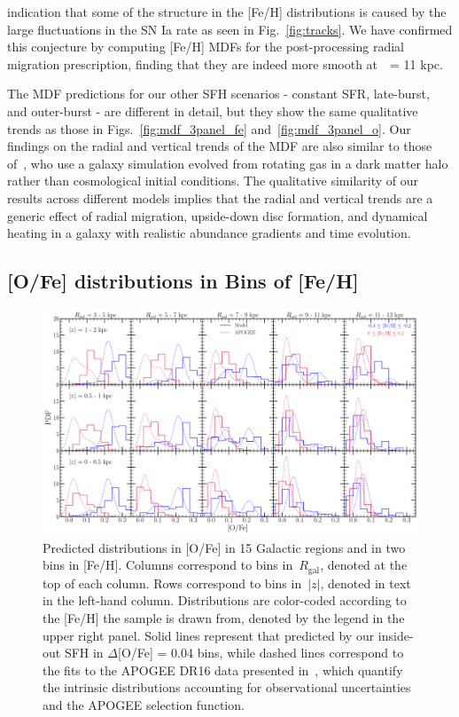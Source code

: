 \documentclass[draft2.tex]{subfiles}
\begin{document}
indication that some of the structure in the [Fe/H] distributions is caused by 
the large fluctuations in the SN Ia rate as seen in Fig.~\ref{fig:tracks}. 
We have confirmed this conjecture by computing [Fe/H] MDFs for the 
post-processing radial migration prescription, finding that they are indeed 
more smooth at~\rgal~= 11 kpc. 
\par 
The MDF predictions for our other SFH scenarios - constant SFR, late-burst, and 
outer-burst - are different in detail, but they show the same qualitative 
trends as those in Figs.~\ref{fig:mdf_3panel_fe} and~\ref{fig:mdf_3panel_o}. 
Our findings on the radial and vertical trends of the MDF are also similar 
to those of~\citet{Loebman2016}, who use a galaxy simulation evolved from 
rotating gas in a dark matter halo rather than cosmological initial conditions. 
The qualitative similarity of our results across different models implies that 
the radial and vertical trends are a generic effect of radial migration, 
upside-down disc formation, and dynamical heating in a galaxy with realistic 
abundance gradients and time evolution. 


\subsection{[O/Fe] distributions in Bins of [Fe/H]} 
\label{sec:obs_comp:ofe_dists} 

\begin{figure} 
\centering 
\includegraphics[scale = 0.32]{ofe_mdfs.pdf} 
\caption{Predicted distributions in [O/Fe] in 15 Galactic regions and in two 
bins in [Fe/H]. Columns correspond to bins in~$R_\text{gal}$, denoted at the 
top of each column. Rows correspond to bins in~$\left|z\right|$, denoted in 
text in the left-hand column. Distributions are color-coded according to the 
[Fe/H] the sample is drawn from, denoted by the legend in the upper right 
panel. Solid lines represent that predicted by our inside-out SFH in 
$\Delta$[O/Fe] = 0.04 bins, while dashed lines correspond to the fits to the 
APOGEE DR16 data presented in~\citet{Vincenzo2021a}, which quantify the 
intrinsic distributions accounting for observational uncertainties and the 
APOGEE selection function. } 
\label{fig:ofe_mdfs_insideout} 
\end{figure} 
\end{document}
